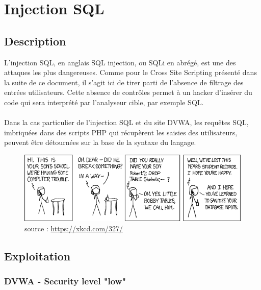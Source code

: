 
\newpage
\section{Injection SQL }


\subsection{Description}




L'injection SQL, en anglais SQL  injection, ou SQLi en abrégé, est une des attaques les plus dangereuses. Comme pour le Cross Site Scripting présenté dans la suite de ce document, il s'agit ici de tirer parti de l'absence de filtrage des entrées utilisateurs. Cette absence de contrôles permet à un hacker d'insérer du code qui sera interprété par l'analyseur cible, par exemple SQL.




\paragraph{}
Dans la cas particulier de l'injection SQL et du site DVWA, les requêtes SQL, imbriquées dans des scripts PHP qui récupèrent les saisies des utilisateurs, peuvent être détournées sur la base de la syntaxe du langage. 

\begin{figure}[!h]
	\begin{center}
		\includegraphics[scale=1]{images/bd.png}
		\caption{source : \url{https://xkcd.com/327/}}
	\end{center}
\end{figure}


\subsection{Exploitation}

\subsubsection{DVWA - Security level "low"}

